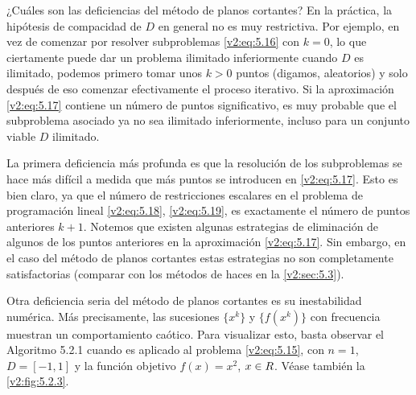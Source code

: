 ¿Cuáles son las deficiencias del método de planos cortantes? En la práctica, la hipótesis de compacidad de $D$ en general no es muy restrictiva. Por ejemplo, en vez de comenzar por resolver subproblemas \eqref{v2:eq:5.16} con $k=0$, lo que ciertamente puede dar un problema ilimitado inferiormente cuando $D$ es ilimitado, podemos primero tomar unos $k > 0$ puntos (digamos, aleatorios) y solo después de eso comenzar efectivamente el proceso iterativo. Si la aproximación \eqref{v2:eq:5.17} contiene un número de puntos significativo, es muy probable que el subproblema asociado ya no sea ilimitado inferiormente, incluso para un conjunto viable $D$ ilimitado.

La primera deficiencia más profunda es que la resolución de los subproblemas se hace más difícil a medida que más puntos se introducen en \eqref{v2:eq:5.17}. Esto es bien claro, ya que el número de restricciones escalares en el problema de programación lineal \eqref{v2:eq:5.18}, \eqref{v2:eq:5.19}, es exactamente el número de puntos anteriores $k+1$. Notemos que existen algunas estrategias de eliminación de algunos de los puntos anteriores en la aproximación \eqref{v2:eq:5.17}. Sin embargo, en el caso del método de planos cortantes estas estrategias no son completamente satisfactorias (comparar con los métodos de haces en la \cref{v2:sec:5.3}).

Otra deficiencia seria del método de planos cortantes es su inestabilidad numérica. Más precisamente, las sucesiones $\{x^k\}$ y $\{f(x^k)\}$ con frecuencia muestran un comportamiento caótico. Para visualizar esto, basta observar el Algoritmo 5.2.1 cuando es aplicado al problema \eqref{v2:eq:5.15}, con $n=1$, $D = [-1, 1]$ y la función objetivo $f(x) = x^2$, $x \in R$. Véase también la \cref{v2:fig:5.2.3}.

